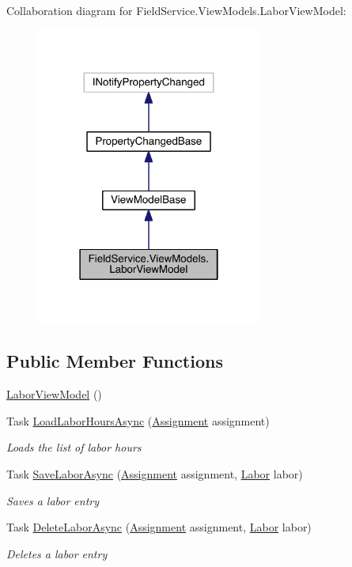 Collaboration diagram for Field\+Service.\+View\+Models.\+Labor\+View\+Model\+:
\nopagebreak
\begin{figure}[H]
\begin{center}
\leavevmode
\includegraphics[width=210pt]{class_field_service_1_1_view_models_1_1_labor_view_model__coll__graph}
\end{center}
\end{figure}
\subsection*{Public Member Functions}
\begin{DoxyCompactItemize}
\item 
\hyperlink{class_field_service_1_1_view_models_1_1_labor_view_model_a40df2f8a2f8ebdfc0232e163b93eb07a}{Labor\+View\+Model} ()
\item 
Task \hyperlink{class_field_service_1_1_view_models_1_1_labor_view_model_ac2a9b008a606a302132dc071c3f2b625}{Load\+Labor\+Hours\+Async} (\hyperlink{class_field_service_1_1_data_1_1_assignment}{Assignment} assignment)
\begin{DoxyCompactList}\small\item\em Loads the list of labor hours \end{DoxyCompactList}\item 
Task \hyperlink{class_field_service_1_1_view_models_1_1_labor_view_model_aa625a08d7499884778b27c83ed43f932}{Save\+Labor\+Async} (\hyperlink{class_field_service_1_1_data_1_1_assignment}{Assignment} assignment, \hyperlink{class_field_service_1_1_data_1_1_labor}{Labor} labor)
\begin{DoxyCompactList}\small\item\em Saves a labor entry \end{DoxyCompactList}\item 
Task \hyperlink{class_field_service_1_1_view_models_1_1_labor_view_model_a644eb58bfd4329e46ae337e4173d0bcc}{Delete\+Labor\+Async} (\hyperlink{class_field_service_1_1_data_1_1_assignment}{Assignment} assignment, \hyperlink{class_field_service_1_1_data_1_1_labor}{Labor} labor)
\begin{DoxyCompactList}\small\item\em Deletes a labor entry \end{DoxyCompactList}\end{DoxyCompactItemize}
